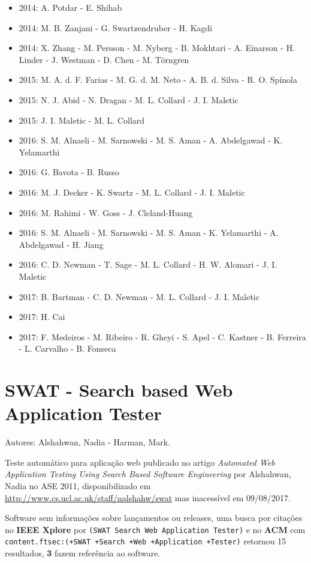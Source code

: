 \begin{itemize}
\item 2014: A. Potdar - E. Shihab
\item 2014: M. B. Zanjani - G. Swartzendruber - H. Kagdi
\item 2014: X. Zhang - M. Persson - M. Nyberg - B. Mokhtari - A. Einarson - H. Linder - J. Westman - D. Chen - M. Törngren
\item 2015: M. A. d. F. Farias - M. G. d. M. Neto - A. B. d. Silva - R. O. Spínola
\item 2015: N. J. Abid - N. Dragan - M. L. Collard - J. I. Maletic
\item 2015: J. I. Maletic - M. L. Collard
\item 2016: S. M. Alnaeli - M. Sarnowski - M. S. Aman - A. Abdelgawad - K. Yelamarthi
\item 2016: G. Bavota - B. Russo
\item 2016: M. J. Decker - K. Swartz - M. L. Collard - J. I. Maletic
\item 2016: M. Rahimi - W. Goss - J. Cleland-Huang
\item 2016: S. M. Alnaeli - M. Sarnowski - M. S. Aman - K. Yelamarthi - A. Abdelgawad - H. Jiang
\item 2016: C. D. Newman - T. Sage - M. L. Collard - H. W. Alomari - J. I. Maletic
\item 2017: B. Bartman - C. D. Newman - M. L. Collard - J. I. Maletic
\item 2017: H. Cai
\item 2017: F. Medeiros - M. Ribeiro - R. Gheyi - S. Apel - C. Kastner - B. Ferreira - L. Carvalho - B. Fonseca
\end{itemize}

\section{SWAT - Search based Web Application Tester}

Autores:
Alshahwan, Nadia - Harman, Mark.

Teste automático para aplicação web
publicado no artigo {\it Automated Web Application Testing Using Search Based Software Engineering}
por Alshahwan, Nadia
no ASE 2011,
disponibilizado em \url{http://www.cs.ucl.ac.uk/staff/nalshahw/swat}
mas inacessível em 09/08/2017.

Software sem informações sobre lançamentos ou releases,
uma busca por citações no {\bf IEEE Xplore} por
\texttt{(SWAT Search Web Application Tester)}
e no {\bf ACM} com
\texttt{content.ftsec:(+SWAT +Search +Web +Application +Tester)}
retornou
15 resultados,
{\bf 3} fazem referência ao software.


